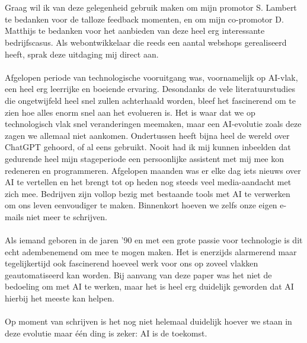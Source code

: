 
\chapter*{}%
\label{ch:voorwoord}


Graag wil ik van deze gelegenheid gebruik maken om mijn promotor S. Lambert te bedanken voor de talloze feedback momenten, en om mijn co-promotor D. Matthijs te bedanken voor het aanbieden van deze heel erg interessante bedrijfscasus. Als webontwikkelaar die reeds een aantal webshops gerealiseerd heeft, sprak deze uitdaging mij direct aan.
\\\\
Afgelopen periode van technologische vooruitgang was, voornamelijk op AI-vlak, een heel erg leerrijke en boeiende ervaring. Desondanks de vele literatuurstudies die ongetwijfeld heel snel zullen achterhaald worden, bleef het fascinerend om te zien hoe alles enorm snel aan het evolueren is. Het is waar dat we op technologisch vlak snel veranderingen meemaken, maar een AI-evolutie zoals deze zagen we allemaal niet aankomen. Ondertussen heeft bijna heel de wereld over ChatGPT gehoord, of al eens gebruikt. Nooit had ik mij kunnen inbeelden dat gedurende heel mijn stageperiode een persoonlijke assistent met mij mee kon redeneren en programmeren. Afgelopen maanden was er elke dag iets nieuws over AI te vertellen en het brengt tot op heden nog steeds veel media-aandacht met zich mee. Bedrijven zijn vollop bezig met bestaande tools met AI te verwerken om ons leven eenvoudiger te maken. Binnenkort hoeven we zelfs onze eigen e-mails niet meer te schrijven.
\\\\
Als iemand geboren in de jaren '90 en met een grote passie voor technologie is dit echt adembenemend om mee te mogen maken. Het is enerzijds alarmerend maar tegelijkertijd ook fascinerend hoeveel werk voor ons op zoveel vlakken geautomatiseerd kan worden. Bij aanvang van deze paper was het niet de bedoeling om met AI te werken, maar het is heel erg duidelijk geworden dat AI hierbij het meeste kan helpen.
\\\\
Op moment van schrijven is het nog niet helemaal duidelijk hoever we staan in deze evolutie maar één ding is zeker: AI is de toekomst.